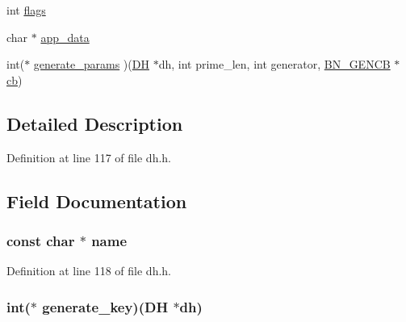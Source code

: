 \begin{DoxyCompactItemize}
\item 
int \hyperlink{structdh__method_ac8bf36fe0577cba66bccda3a6f7e80a4}{flags}
\item 
char $\ast$ \hyperlink{structdh__method_adc165d2dbd917509babcf4bcce182a13}{app\+\_\+data}
\item 
int($\ast$ \hyperlink{structdh__method_aee5f5e94b498bcedb84fccc3dd5e6e4b}{generate\+\_\+params} )(\hyperlink{crypto_2ossl__typ_8h_a5a5072cfe75a51d0ff201c0a8d2d68b2}{DH} $\ast$dh, int prime\+\_\+len, int generator, \hyperlink{crypto_2ossl__typ_8h_ae122a8be18f4fe821e5389381ececa09}{B\+N\+\_\+\+G\+E\+N\+CB} $\ast$\hyperlink{include_2openssl_2pem_8h_a921d6e42da41258bdbb0d8184d7554a2}{cb})
\end{DoxyCompactItemize}


\subsection{Detailed Description}


Definition at line 117 of file dh.\+h.



\subsection{Field Documentation}
\subsubsection[{\texorpdfstring{name}{name}}]{\setlength{\rightskip}{0pt plus 5cm}const char $\ast$ name}\hypertarget{structdh__method_afcd1706c9144e6d6eee6127661ae3be2}{}\label{structdh__method_afcd1706c9144e6d6eee6127661ae3be2}


Definition at line 118 of file dh.\+h.

\subsubsection[{\texorpdfstring{generate\+\_\+key}{generate_key}}]{\setlength{\rightskip}{0pt plus 5cm}int($\ast$ generate\+\_\+key)({\bf DH} $\ast$dh)}\hypertarget{structdh__method_a83c666d38c8c8d7056d76941684b09e7}{}\label{structdh__method_a83c666d38c8c8d7056d76941684b09e7}


